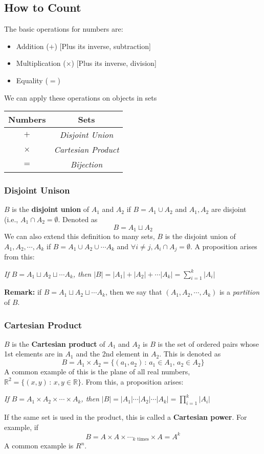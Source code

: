 \documentclass{report}
\begin{document}
\subsection{How to Count}
The basic operations for numbers are:
\begin{itemize}
\item Addition ($+$) [Plus its inverse, subtraction]
\item Multiplication ($\times$) [Plus its inverse, division]
\item Equality ($=$)
\end{itemize}
We can apply these operations on objects in sets
\begin{center}
\begin{tabular}{ c | c }
\textbf{Numbers} & \textbf{Sets} \\ \hline
$+$ & \textit{Disjoint Union} \\
$\times$ & \textit{Cartesian Product} \\
$=$ & \textit{Bijection}
\end{tabular}
\end{center}
\subsubsection{Disjoint Unison}
$B$ is the \textbf{disjoint union} of $A_1$ and $A_2$ if $B = A_1 \cup A_2$ and $A_1, A_2$ are disjoint (i.e., $A_1 \cap A_2 = \emptyset$. Denoted as $$B = A_1 \sqcup  A_2$$
We can also extend this definition to many sets, $B$ is the disjoint union of $A_1, A_2, \cdots, A_k$ if $B = A_1 \cup A_2 \cup \cdots A_k$ and $\forall i \neq j, A_i \cap A_j = \emptyset$. A proposition arises from this:
\begin{center}
\textit{If $B = A_1 \sqcup  A_2 \sqcup  \cdots A_k$, then $|B| = |A_1| + |A_2| + \cdots |A_k| = \displaystyle\sum_{i=1}^k |A_i|$}
\end{center}
\textbf{Remark:} if $B = A_1 \sqcup  A_2 \sqcup \cdots A_k$, then we say that $(A_1, A_2, \cdots, A_k)$ is a \textit{partition} of $B$.
\subsubsection{Cartesian Product}
$B$ is the \textbf{Cartesian product} of $A_1$ and $A_2$ is $B$ is the set of ordered pairs whose 1st elements are in $A_1$ and the 2nd element in $A_2$. This is denoted as
$$B = A_1 \times A_2 = \{(a_1, a_2) \,:\,a_1 \in A_1,\, a_2 \in A_2 \}$$
A common example of this is the plane of all real numbers, $\mathbb{R}^2 = \{(x,y) \, : \, x,y \in \mathbb{R}\}$. From this, a proposition arises:
\begin{center}
\textit{If $B = A_1 \times A_2 \times \cdots \times A_k$, then $|B| = |A_1| \cdots |A_2| \cdots |A_k| = \displaystyle\prod_{i=1}^k |A_i|$}
\end{center}
If the same set is used in the product, this is called a \textbf{Cartesian power}. For example, if $$B = A \times A \times \cdots_{k\mathrm{\,\,times}} \times A = A^k$$
A common example is $R^n$.
\end{document}
